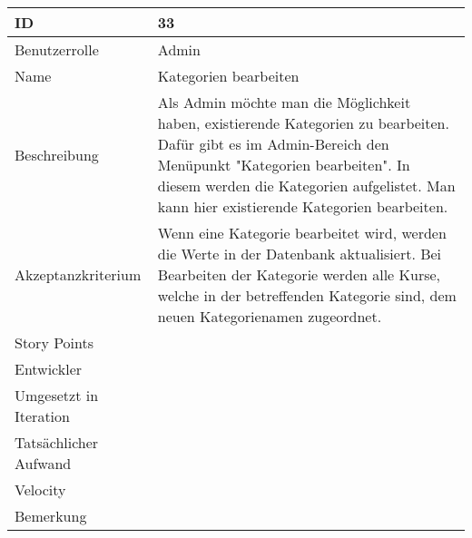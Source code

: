 \begin{tabularx}{\textwidth}{|p{}|X|}
	\hline
	ID & 33 \\
	\hline
	Benutzerrolle & Admin \\
	\hline
	Name & Kategorien bearbeiten\\
	\hline
	Beschreibung & Als Admin möchte man die Möglichkeit haben, existierende Kategorien zu bearbeiten. Dafür gibt es im Admin-Bereich den Menüpunkt "Kategorien bearbeiten". In diesem werden die Kategorien aufgelistet. Man kann hier existierende Kategorien bearbeiten. \\
	\hline
	Akzeptanzkriterium & Wenn eine Kategorie bearbeitet wird, werden die Werte in der Datenbank aktualisiert. Bei Bearbeiten der Kategorie werden alle Kurse, welche in der betreffenden Kategorie sind, dem neuen Kategorienamen zugeordnet. \\
	\hline
	Story Points &  \\
	\hline
	Entwickler &  \\
	\hline
	Umgesetzt in Iteration & \\
	\hline
	Tatsächlicher Aufwand & \\
	\hline
	Velocity & \\
	\hline
	Bemerkung & \\
	\hline
\end{tabularx}
\vspace{20pt}

